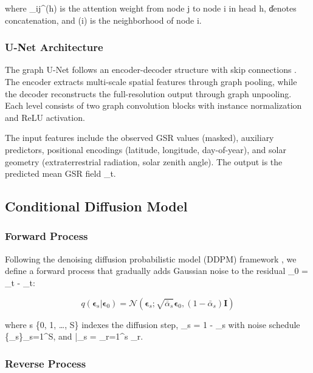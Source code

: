 \documentclass[preprint,12pt]{elsarticle}
\begin{document}
where \alpha_{ij}^{(h)} is the attention weight from node j to node i in head h, \| denotes concatenation, and (i) is the neighborhood of node i.

\subsubsection{U-Net Architecture}

The graph U-Net follows an encoder-decoder structure with skip connections \cite{ronneberger2015u}. The encoder extracts multi-scale spatial features through graph pooling, while the decoder reconstructs the full-resolution output through graph unpooling. Each level consists of two graph convolution blocks with instance normalization and ReLU activation.

The input features include the observed GSR values (masked), auxiliary predictors, positional encodings (latitude, longitude, day-of-year), and solar geometry (extraterrestrial radiation, solar zenith angle). The output is the predicted mean GSR field \hat{\boldsymbol{\mu}}_t.

\subsection{Conditional Diffusion Model}
\label{sec:diffusion}

\subsubsection{Forward Process}

Following the denoising diffusion probabilistic model (DDPM) framework \cite{ho2020denoising}, we define a forward process that gradually adds Gaussian noise to the residual \boldsymbol{\epsilon}_0 = _t - \hat{\boldsymbol{\mu}}_t:

\begin{equation}
q(\boldsymbol{\epsilon}_s | \boldsymbol{\epsilon}_0) = \mathcal{N}(\boldsymbol{\epsilon}_s; \sqrt{\bar{\alpha}_s}\boldsymbol{\epsilon}_0, (1-\bar{\alpha}_s)\mathbf{I})
\label{eq:forward}
\end{equation}

where s \in \{0, 1, \ldots, S\} indexes the diffusion step, \alpha_s = 1 - \beta_s with noise schedule \{\beta_s\}_{s=1}^S, and \bar{\alpha}_s = \prod_{r=1}^s \alpha_r.

\subsubsection{Reverse Process}
\end{document}
